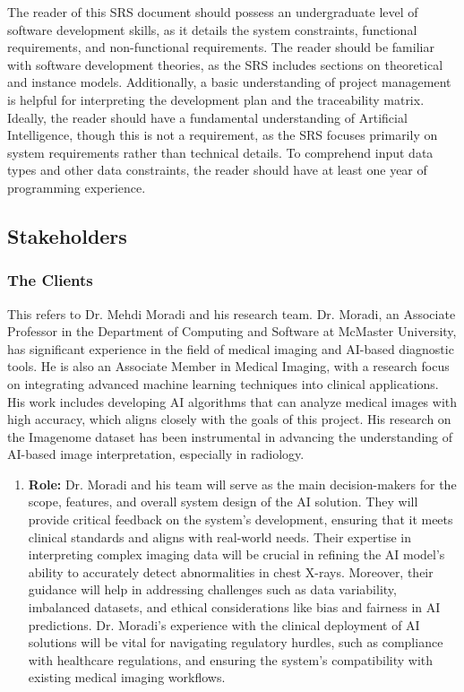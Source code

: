 \documentclass[12pt]{article}
\begin{document}
The reader of this SRS document should possess an undergraduate level of software development skills, as it details the system constraints, functional requirements, and non-functional requirements. The reader should be familiar with software development theories, as the SRS includes sections on theoretical and instance models. Additionally, a basic understanding of project management is helpful for interpreting the development plan and the traceability matrix. Ideally, the reader should have a fundamental understanding of Artificial Intelligence, though this is not a requirement, as the SRS focuses primarily on system requirements rather than technical details. To comprehend input data types and other data constraints, the reader should have at least one year of programming experience.\\
\newpage
\subsection{Stakeholders}
\subsubsection{The Clients} 
This refers to Dr. Mehdi Moradi and his research team. Dr. Moradi, an Associate Professor in the Department of Computing and Software at McMaster University, has significant experience in the field of medical imaging and AI-based diagnostic tools. He is also an Associate Member in Medical Imaging, with a research focus on integrating advanced machine learning techniques into clinical applications. His work includes developing AI algorithms that can analyze medical images with high accuracy, which aligns closely with the goals of this project. His research on the Imagenome dataset has been instrumental in advancing the understanding of AI-based image interpretation, especially in radiology.
\begin{enumerate}
\item \textbf{Role:} Dr. Moradi and his team will serve as the main decision-makers for the scope, features, and overall system design of the AI solution. They will provide critical feedback on the system's development, ensuring that it meets clinical standards and aligns with real-world needs. Their expertise in interpreting complex imaging data will be crucial in refining the AI model's ability to accurately detect abnormalities in chest X-rays. Moreover, their guidance will help in addressing challenges such as data variability, imbalanced datasets, and ethical considerations like bias and fairness in AI predictions. Dr. Moradi’s experience with the clinical deployment of AI solutions will be vital for navigating regulatory hurdles, such as compliance with healthcare regulations, and ensuring the system's compatibility with existing medical imaging workflows.
\end{enumerate}
\end{document}
